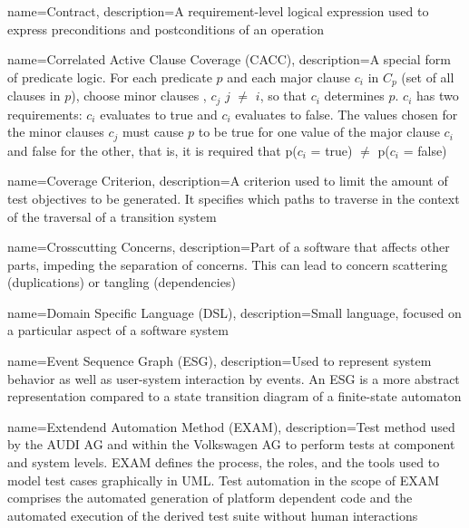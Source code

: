 {
	name={Contract},
	description={A requirement-level logical expression used to express preconditions and postconditions of an operation \cite{ClementineNebut2006}}
}

{
	name={Correlated Active Clause Coverage (CACC)},
	description={A special form of predicate logic. For each predicate $p$ and each major clause $c_i$  in $C_p$ (set of all clauses in $p$), choose minor clauses , $c_j$  $j$ $\neq$ $i$, so that $c_i$ determines $p$. $c_i$ has two requirements: $c_i$ evaluates to true and $c_i$ evaluates to false. The values chosen for the minor clauses $c_j$ must cause $p$ to be true for one value of the major clause $c_i$ and false for the other, that is, it is required that p($c_i$ = true) $\neq$ p($c_i$ = false) \cite{Ammann2021}}
}

{
	name={Coverage Criterion},
	description={A criterion used to limit the amount of test objectives to be generated. It specifies which paths to traverse in the context of the traversal of a transition system \cite{ClementineNebut2006}}
}

{
	name={Crosscutting Concerns},
	description={Part of a software that affects other parts, impeding the separation of concerns. This can lead to concern scattering (duplications) or tangling (dependencies) \cite{Metsa}}
}

{
	name={Domain Specific Language (DSL)},
	description={Small language, focused on a particular aspect of a software system \cite{Fowler2010}}
}

{
	name={Event Sequence Graph (ESG)},
	description={Used to represent system behavior as well as user-system interaction by events. An ESG is a more abstract representation compared to a state transition diagram of a finite-state automaton \cite{Belli2009}}
}

{
	name={Extendend Automation Method (EXAM)},
	description={Test method used by the AUDI AG and within the Volkswagen AG to perform tests at component and system levels. EXAM defines the process, the roles, and the tools used to model test cases graphically in UML. Test automation in the scope of EXAM comprises the automated generation of platform dependent code and the automated execution of the derived test suite without human interactions \cite{Siegl2010}}
}

